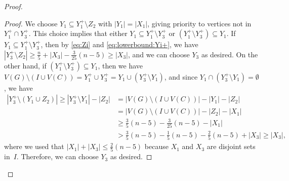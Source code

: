 \documentclass[a4paper,12pt]{article}
\begin{document}
\begin{proof}
\begin{proof}
        We choose $Y_1\subseteq Y^+_1\setminus Z_2$ with $|Y_1|=|X_1|$, 
        giving priority to vertices not in $Y^+_1\cap Y^+_3$.
        This choice implies that either $Y_1\subseteq Y^+_1\setminus Y^+_3$
        or $(Y^+_1\setminus Y^+_3)\subseteq Y_1$.
%       
        If $Y_1\subseteq Y^+_1\setminus Y^+_3$,
        then by \eqref{eq:Zi} and \eqref{eq:lowerbound:Yi+},
        we have $|Y^+_3\setminus Z_2| \geq \frac{n}{5} + |X_3|-\frac{3}{25}(n-5)\geq |X_3|$, and we can choose \(Y_3\) as desired.
%        
        On the other hand, if $(Y^+_1\setminus Y^+_3)\subseteq Y_1$, then 
        we have \(V(G) \setminus (I \cup V(C)) = Y_1^+ \cup Y_3^+ = Y_1 \cup (Y_3^+\setminus Y_1)\), and since \(Y_1 \cap (Y_3^+\setminus Y_1) = \emptyset\), 
        we have
        \begin{align*} %
            |Y_3^+\setminus (Y_1\cup Z_2)| 
                \geq |Y_3^+\setminus Y_1| - |Z_2| 
                & = |V(G)\setminus(I\cup V(C))| - |Y_1| - |Z_2|\\
                & = |V(G)\setminus(I\cup V(C))|-|Z_2|-|X_1| \\
                &  \geq \frac{3}{5}(n-5)-\frac{3}{25}(n-5)-|X_1| \\
                &   >    \frac{3}{5}(n-5)-\frac{1}{5}(n-5)-\frac{2}{5}(n-5)+|X_3| 
                \geq |X_3|,
        \end{align*}
        where we used that \(|X_1| + |X_3| \leq \frac{2}{5}(n-5)\) 
        because \(X_1\) and \(X_3\) are disjoint sets in~\(I\).
        Therefore, we can choose \(Y_3\) as desired.
    \end{proof}

    \begin{figure}[h]
\label{fig:inductionfor2n/5}
\centering
{}
\end{figure}
\end{proof}
\end{document}

